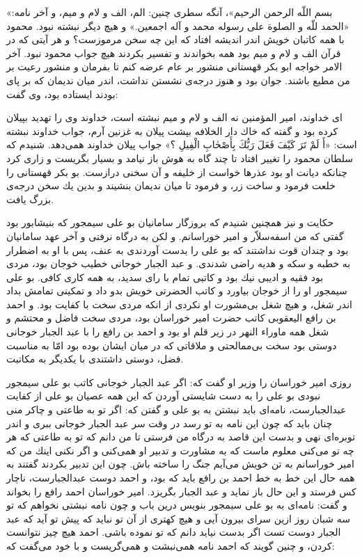 «بسم اللّه الرحمن الرحيم»، آنگه سطرى چنين: الم، الف و لام و ميم، و آخر نامه: «الحمد للّه و الصلوة على رسوله محمد و آله اجمعين.» و هيچ ديگر نبشته نبود. محمود با همه كاتبان خويش اندر انديشه افتاد كه اين چه سخن مرموزست‌؟ و هر آيتى كه در قرآن الف و لام و ميم بود همه بخواندند و تفسير بكردند هيچ جواب محمود نبود. آخر الامر خواجه ابو بكر قهستانى منشور بر عام عرضه كنم تا بفرمان و منشور رعيت بر من مطيع  باشند. جوان بود و هنوز درجه‌ی نشستن نداشت، اندر ميان نديمان كه بر پاى بودند ايستاده بود، وى گفت:

اى خداوند، امير المؤمنين نه الف و لام و ميم نبشته است، خداوند وى را تهديد بپيلان كرده بود و گفته كه خاك دار الخلافه بپشت پيلان به غزنين آرم، جواب خداوند نبشته است: «أَ لَمْ تَرَ كَيْفَ فَعَلَ رَبُّكَ بِأَصْحٰابِ الْفِيلِ ؟» جواب پيلان خداوند همى‌دهد. شنيدم كه سلطان محمود را تغيير افتاد تا چند گاه به هوش باز نيامد و بسيار بگريست و زارى كرد چنانكه ديانت او بود عذرها خواست از خليفه و آن سخنى درازست. بو بكر قهستانى را خلعت فرمود و ساخت زر، و فرمود تا ميان نديمان بنشيند و بدين يك سخن درجه‌ی بزرگ يافت.

حكايت و نيز همچنين شنيدم كه بروزگار سامانيان بو على سيمجور كه بنيشابور بود گفتى كه من اسفه‌سلاّر و امير خوراسانم. و لكن به درگاه نرفتى و آخر عهد سامانيان بود و چندان قوت نداشتند كه بو على را بدست آوردندى به عنف، پس با او به اضطرار به خطبه و سكه و هديه راضى شدندى. و عبد الجبار خوجانى خطيب خوجان بود، مردى بود فقيه و اديبى نيك بود و كاتبى تمام با راى سديد، به همه كارى كافى. بو على سيمجور او را از خوجان بياورد و كاتب الحضرتى خويش بدو داد و تمكينى تمامش بداد اندر شغل، و هيچ شغل بى‌مشورت او نكردى از انكه مردى سخت با كفايت بود. و احمد بن رافع اليعقوبى كاتب حضرت امير خوراسان بود، مردى سخت فاضل و محتشم و شغل همه ماور‌‌اء النهر در زير قلم او بود و احمد بن رافع را با عبد الجبار خوجانى دوستى بود سخت بى‌ممالحتى و ملاقاتى كه در ميان ايشان بوده بود امّا به مناسبت فضل، دوستى داشتندى با يكديگر به مكاتبت.

روزى امير خوراسان را وزير او گفت كه: اگر عبد الجبار خوجانى كاتب بو على سيمجور نبودى بو على را به دست شايستى آوردن كه اين همه عصيان بو على از كفايت عبدالجبارست، نامه‌اى بايد نبشتن به بو على و گفتن كه: اگر تو به طاعتى و چاكر منى چنان بايد كه چون اين نامه به تو رسد در وقت سر عبد الجبار خوجانى ببرى و اندر توبره‌اى نهى و بدست اين قاصد به درگاه من فرستى تا من دانم كه تو به طاعتى كه هر چه تو مى‌كنى معلوم ماست كه به مشاورت و تدبير او همى‌كنى و اگر نكنى اينك من كه امير خوراسانم به تن خويش مى‌آيم جنگ را ساخته باش. چون اين تدبير بكردند گفتند به همه حال اين خط به خط احمد بن رافع بايد كه بود، و احمد دوست عبدالجبارست، ناچار كس فرستد و اين حال باز نمايد و عبد الجبار بگريزد. امير خوراسان احمد رافع را بخواند و گفت: نامه‌اى به بو على سيمجور بنويس درين باب و چون نامه نبشتى نخواهم كه تو سه شبان روز ازين سراى بيرون آيى و هيچ كهترى از آن تو نبايد كه پيش تو آيد كه عبد الجبار دوست تست اگر بدست نيايد دانم كه تو نموده باشى. احمد هيچ چيز نتوانست كردن، و چنين گويند كه احمد نامه همى‌نبشت و همى‌گريست و با خود مى‌گفت كه:

